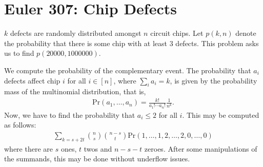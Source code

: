 \documentclass{article}
\begin{document}
\section*{Euler 307: Chip Defects}

$k$ defects are randomly distributed amongst $n$ circuit chips. 
Let $p(k,n)$ denote the probability that there is some chip with
at least $3$ defects. This problem asks us to find $p(20000,1000000)$. 

We compute the probability of the complementary event. The probability
that $a_i$ defects affect chip $i$ for all $i\in [n]$, where $\sum_i a_i
= k$, is given by the probability mass of the multinomial distribution, 
that is,
\begin{align*}
	\mbox{Pr}(a_1,\dots, a_n) = \frac{k!}{a_1 !\cdots a_n !}\frac{1}{n^k}. 
\end{align*}
Now, we have to find the probability that $a_i\leq 2$ for all $i$. This
may be computed as follows:
\begin{align*}
	\sum_{k = s+2t}\binom{n}{s}\binom{n-s}{t}\mbox{Pr}(1,\dots,1,2,\dots,2,0,\dots,0)
\end{align*}
where there are $s$ ones, $t$ twos and $n-s-t$ zeroes. After some
manipulations of the summands, this may be done without underflow issues.
\end{document}
